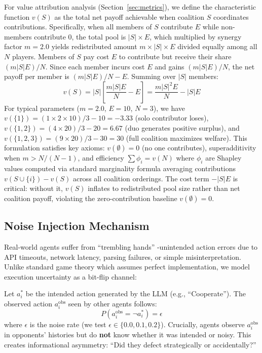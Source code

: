 \documentclass{uai2026} %
\begin{document}
For value attribution analysis (Section~\ref{sec:metrics}), we define the characteristic function $v(S)$ as the total net payoff achievable when coalition $S$ coordinates contributions. Specifically, when all members of $S$ contribute $E$ while non-members contribute 0, the total pool is $|S| \times E$, which multiplied by synergy factor $m=2.0$ yields redistributed amount $m \times |S| \times E$ divided equally among all $N$ players. Members of $S$ pay cost $E$ to contribute but receive their share $(m|S|E)/N$. Since each member incurs cost $E$ and gains $(m|S|E)/N$, the net payoff per member is $(m|S|E)/N - E$. Summing over $|S|$ members:
\begin{equation}
    v(S) = |S| \left[\frac{m|S|E}{N} - E\right] = \frac{m|S|^2E}{N} - |S|E
\end{equation}
For typical parameters ($m=2.0$, $E=10$, $N=3$), we have $v(\{1\}) = (1 \times 2 \times 10)/3 - 10 = -3.33$ (solo contributor loses), $v(\{1,2\}) = (4 \times 20)/3 - 20 = 6.67$ (duo generates positive surplus), and $v(\{1,2,3\}) = (9 \times 20)/3 - 30 = 30$ (full coalition maximizes welfare). This formulation satisfies key axioms: $v(\emptyset) = 0$ (no one contributes), superadditivity when $m > N/(N-1)$, and efficiency $\sum \phi_i = v(N)$ where $\phi_i$ are Shapley values computed via standard marginality formula averaging contributions $v(S \cup \{i\}) - v(S)$ across all coalition orderings. The cost term $-|S|E$ is critical: without it, $v(S)$ inflates to redistributed pool size rather than net coalition payoff, violating the zero-contribution baseline $v(\emptyset) = 0$.

\subsection{Noise Injection Mechanism}

Real-world agents suffer from ``trembling hands'' \citep{selten1975reexamination}-unintended action errors due to API timeouts, network latency, parsing failures, or simple misinterpretation. Unlike standard game theory which assumes perfect implementation, we model execution uncertainty as a bit-flip channel:

Let $a_i^*$ be the intended action generated by the LLM (e.g., ``Cooperate''). The observed action $a_i^{\text{obs}}$ seen by other agents follows:
\begin{equation}
    P(a_i^{\text{obs}} = \neg a_i^*) = \epsilon
\end{equation}
where $\epsilon$ is the noise rate (we test $\epsilon \in \{0.0, 0.1, 0.2\}$). Crucially, agents observe $a_i^{\text{obs}}$ in opponents' histories but do \textbf{not} know whether it was intended or noisy. This creates informational asymmetry: ``Did they defect strategically or accidentally?''
\end{document}
